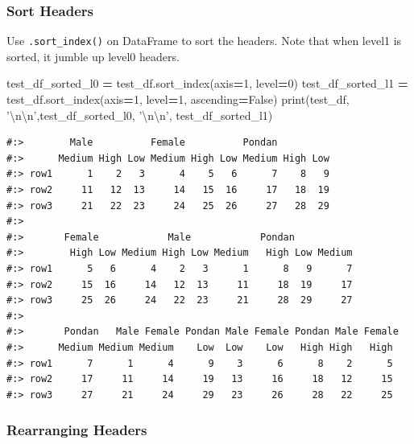 \documentclass[
]{book}
\newenvironment{Shaded}{\begin{snugshade}}{\end{snugshade}}
\newcommand{\BuiltInTok}[1]{#1}
\newcommand{\CharTok}[1]{\textcolor[rgb]{0.5,0.5,0.5}{#1}}
\newcommand{\DecValTok}[1]{\textcolor[rgb]{0.06,0.06,0.06}{#1}}
\newcommand{\NormalTok}[1]{#1}
\newcommand{\OperatorTok}[1]{\textcolor[rgb]{0.43,0.43,0.43}{\textbf{#1}}}
\newcommand{\StringTok}[1]{\textcolor[rgb]{0.5,0.5,0.5}{#1}}
\newcommand{\VariableTok}[1]{\textcolor[rgb]{0,0,0}{#1}}
\begin{document}
\hypertarget{sort-headers}{%
\subsubsection{Sort Headers}\label{sort-headers}}

Use \texttt{.sort\_index()} on DataFrame to sort the headers. Note that when level1 is sorted, it jumble up level0 headers.

\begin{Shaded}
\begin{Highlighting}[]
\NormalTok{test_df_sorted_l0 }\OperatorTok{=}\NormalTok{ test_df.sort_index(axis}\OperatorTok{=}\DecValTok{1}\NormalTok{, level}\OperatorTok{=}\DecValTok{0}\NormalTok{)}
\NormalTok{test_df_sorted_l1 }\OperatorTok{=}\NormalTok{ test_df.sort_index(axis}\OperatorTok{=}\DecValTok{1}\NormalTok{, level}\OperatorTok{=}\DecValTok{1}\NormalTok{, ascending}\OperatorTok{=}\VariableTok{False}\NormalTok{)}
\BuiltInTok{print}\NormalTok{(test_df, }\StringTok{'}\CharTok{\textbackslash{}n\textbackslash{}n}\StringTok{'}\NormalTok{,test_df_sorted_l0, }\StringTok{'}\CharTok{\textbackslash{}n\textbackslash{}n}\StringTok{'}\NormalTok{, test_df_sorted_l1)}
\end{Highlighting}
\end{Shaded}

\begin{verbatim}
#:>        Male          Female          Pondan         
#:>      Medium High Low Medium High Low Medium High Low
#:> row1      1    2   3      4    5   6      7    8   9
#:> row2     11   12  13     14   15  16     17   18  19
#:> row3     21   22  23     24   25  26     27   28  29 
#:> 
#:>       Female            Male            Pondan           
#:>        High Low Medium High Low Medium   High Low Medium
#:> row1      5   6      4    2   3      1      8   9      7
#:> row2     15  16     14   12  13     11     18  19     17
#:> row3     25  26     24   22  23     21     28  29     27 
#:> 
#:>       Pondan   Male Female Pondan Male Female Pondan Male Female
#:>      Medium Medium Medium    Low  Low    Low   High High   High
#:> row1      7      1      4      9    3      6      8    2      5
#:> row2     17     11     14     19   13     16     18   12     15
#:> row3     27     21     24     29   23     26     28   22     25
\end{verbatim}

\hypertarget{rearranging-headers}{%
\subsubsection{Rearranging Headers}\label{rearranging-headers}}
\end{document}
